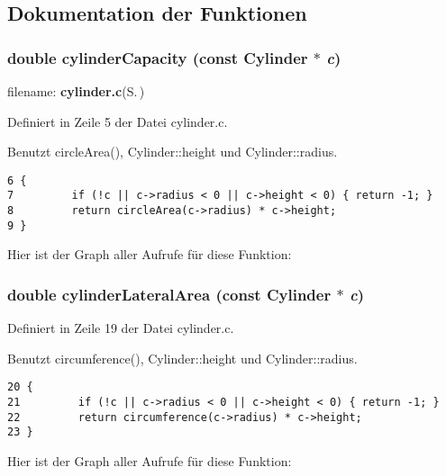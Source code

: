 \subsection{Dokumentation der Funktionen}
\subsubsection{\setlength{\rightskip}{0pt plus 5cm}double cylinder\-Capacity (const {\bf Cylinder} $\ast$ {\em c})}\label{src_2cylinder_8h_c35ebde26ddb19866e3f1259e304cca8}


filename: {\bf cylinder.c}{\rm (S.\,\pageref{cylinder_8c})} 

Definiert in Zeile 5 der Datei cylinder.c.

Benutzt circle\-Area(), Cylinder::height und Cylinder::radius.

\footnotesize\begin{verbatim}6 {
7         if (!c || c->radius < 0 || c->height < 0) { return -1; }
8         return circleArea(c->radius) * c->height;
9 }
\end{verbatim}\normalsize 




Hier ist der Graph aller Aufrufe f\"{u}r diese Funktion:
\subsubsection{\setlength{\rightskip}{0pt plus 5cm}double cylinder\-Lateral\-Area (const {\bf Cylinder} $\ast$ {\em c})}\label{src_2cylinder_8h_bea49511e550ad0db24bf68ce91418ff}




Definiert in Zeile 19 der Datei cylinder.c.

Benutzt circumference(), Cylinder::height und Cylinder::radius.

\footnotesize\begin{verbatim}20 {
21         if (!c || c->radius < 0 || c->height < 0) { return -1; }
22         return circumference(c->radius) * c->height;
23 }
\end{verbatim}\normalsize 




Hier ist der Graph aller Aufrufe f\"{u}r diese Funktion:

